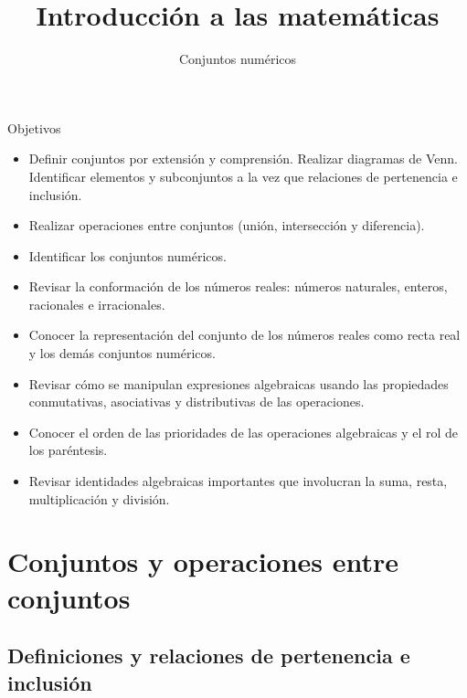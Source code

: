 \documentclass[9pt, aspectratio=169]{beamer}
\title{Introducción a las matemáticas}
\subtitle{Conjuntos numéricos}
\begin{document}
\maketitle

\begin{frame}{ Objetivos }
\begin{multicols}{2}
\begin{itemize}
    \item Definir conjuntos por extensión y comprensión. Realizar diagramas de Venn. Identificar elementos y subconjuntos a la vez que relaciones de pertenencia e inclusión.
    \item Realizar operaciones entre conjuntos (unión, intersección y diferencia).
    \item Identificar los conjuntos numéricos.
    \item Revisar la conformación de los números reales: números naturales, enteros, racionales e irracionales.
    \item Conocer la representación del conjunto de los números reales como recta real y los demás conjuntos numéricos.
\item Revisar cómo se manipulan expresiones algebraicas usando las propiedades conmutativas, asociativas y distributivas de las operaciones.
\item Conocer el orden de las prioridades de las operaciones algebraicas y el rol de los paréntesis.
\item Revisar identidades algebraicas importantes que involucran la suma, resta, multiplicación y división.
\end{itemize}
\end{multicols}
\end{frame}

\section{Conjuntos y operaciones entre conjuntos}
\subsection{Definiciones y relaciones de pertenencia e inclusión}
\end{document}
